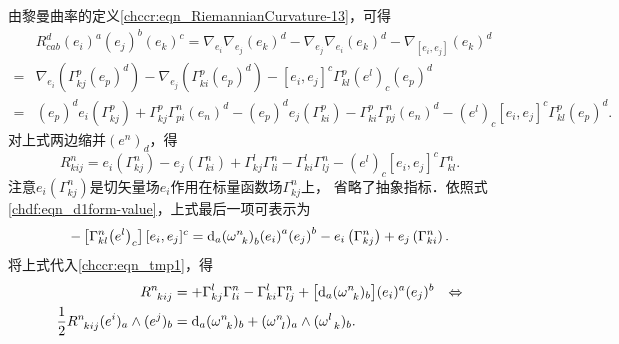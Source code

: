 由黎曼曲率的定义\eqref{chccr:eqn_RiemannianCurvature-13}，可得
\begin{align*}
    &R_{cab}^d{\left( {{e_i}} \right)^a}{\left( {{e_j}} \right)^b}{\left( {{e_k}} \right)^c}
    = {\nabla _{{e_i}}}{\nabla _{{e_j}}}{\left( {{e_k}} \right)^d}
    - {\nabla _{{e_j}}}{\nabla _{{e_i}}}{\left( {{e_k}} \right)^d}
    - {\nabla _{[{e_i},{e_j}]}}{\left( {{e_k}} \right)^d} \\
    =&  {\nabla _{{e_i}}}\left( {\Gamma _{kj}^p{{\left( {{e_p}} \right)}^d}} \right)
    - {\nabla _{{e_j}}}\left( {\Gamma _{ki}^p{{\left( {{e_p}} \right)}^d}} \right)
    - {[{e_i},{e_j}]^c}\Gamma _{kl}^p{\left( {{e^l}} \right)_c}{\left( {{e_p}} \right)^d} \\
    =& {\left( {{e_p}} \right)^d}{e_i}\left( {\Gamma _{kj}^p} \right)
    + \Gamma _{kj}^p\Gamma _{pi}^n{\left( {{e_n}} \right)^d}
    - {\left( {{e_p}} \right)^d}{e_j}\left( {\Gamma _{ki}^p} \right)
    - \Gamma _{ki}^p\Gamma _{pj}^n{\left( {{e_n}} \right)^d}
    - {\left( {{e^l}} \right)_c}{[{e_i},{e_j}]^c}\Gamma _{kl}^p{\left( {{e_p}} \right)^d} .
\end{align*}
对上式两边缩并$(e^n)_d$，得
\begin{equation}\label{chccr:eqn_tmp1}
    R_{kij}^n = {e_i} ( {\Gamma _{kj}^n} ) - {e_j}( {\Gamma _{ki}^n} )
    + \Gamma _{kj}^l\Gamma _{li}^n - \Gamma _{ki}^l\Gamma _{lj}^n
    - {{( {{e^l}} )}_c}{{[{e_i},{e_j}]}^c}\Gamma _{kl}^n .
\end{equation}
注意${e_i} ( {\Gamma _{kj}^n} )$是切矢量场${e_i}$作用在标量函数场${\Gamma _{kj}^n}$上，
省略了抽象指标．依照式\eqref{chdf:eqn_d1form-value}，上式最后一项可表示为
\begin{align}
    - \left[ {\Gamma _{kl}^n{{\left( {{e^l}} \right)}_c}} \right]{[{e_i},{e_j}]^c}
    = {{\text{d}}_a}{\left( {\omega _{\hphantom{a} k}^n} \right)_b}{\left( {{e_i}} \right)^a}
    {\left( {{e_j}} \right)^b} - {e_i}\left( {\Gamma _{kj}^n} \right)
    + {e_j}\left( {\Gamma _{ki}^n} \right) .
\end{align}
将上式代入\eqref{chccr:eqn_tmp1}，得
\begin{align}
    R_{\hphantom{a} kij}^{n} &= + \Gamma _{kj}^l\Gamma _{li}^n - \Gamma _{ki}^l\Gamma _{lj}^n +
    \bigl[{\rm d}_a (\omega_{\hphantom{a} k}^n)_b \bigr] (e_i)^a (e_j)^b
    {\quad  \Leftrightarrow } \label{chccr:eqn_Cartan-Structure-II-comp} \\
    \frac{1}{2}R_{\hphantom{a} kij}^n (e^i)_a \wedge (e^j)_b
    &=  {\rm d}_a ( \omega _{\hphantom{a} k} ^n  )_b  + ( \omega _{\hphantom{a} l}^n )_a 
    \wedge ( \omega _{\hphantom{a} k}^l )_b .  \label{chccr:eqn_Cartan-Structure-II}
\end{align}

